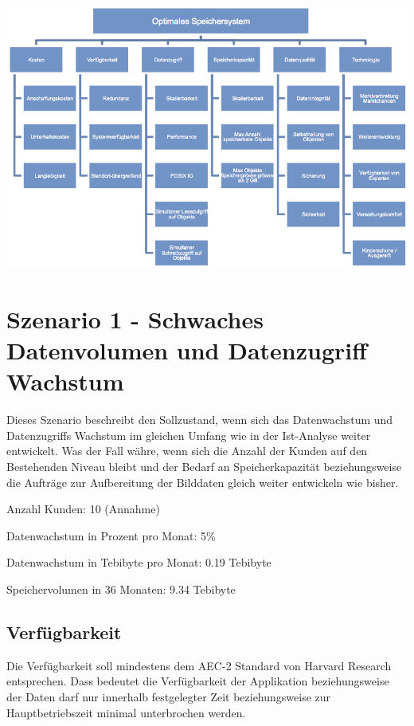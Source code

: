 \begin{center}
\includegraphics[width=\linewidth, keepaspectratio = true]{media/ahp_kirterienbaum.png}
\end{center}

\section{Szenario 1 - Schwaches Datenvolumen und Datenzugriff Wachstum}
Dieses Szenario beschreibt den Sollzustand, wenn sich das Datenwachstum und Datenzugriffs Wachstum im gleichen Umfang wie in der Ist-Analyse weiter entwickelt. Was der Fall währe, wenn sich die Anzahl der Kunden auf den Bestehenden Niveau bleibt und der Bedarf an Speicherkapazität beziehungsweise die Aufträge zur Aufbereitung der Bilddaten gleich weiter entwickeln wie bisher.

Anzahl Kunden: 10 (Annahme)

Datenwachstum in Prozent pro Monat: 5\% 

Datenwachstum in Tebibyte pro Monat: 0.19 Tebibyte

Speichervolumen in 36 Monaten: 9.34 Tebibyte

\subsection{Verfügbarkeit}
Die Verfügbarkeit soll mindestens dem AEC-2 Standard von Harvard Research entsprechen. Dass bedeutet die Verfügbarkeit der Applikation beziehungsweise der Daten darf nur innerhalb festgelegter Zeit beziehungsweise zur Hauptbetriebszeit minimal unterbrochen werden.

